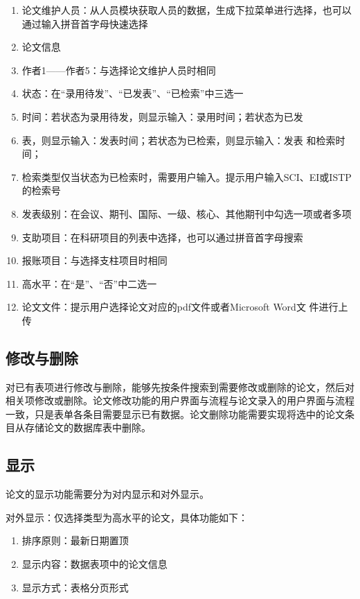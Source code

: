 \begin{enumerate}
\item 论文维护人员：从人员模块获取人员的数据，生成下拉菜单进行选择，也可以通过输入拼音首字母快速选择
\item 论文信息
\item 作者1——作者5：与选择论文维护人员时相同
\item 状态：在“录用待发”、“已发表”、“已检索”中三选一
\item 时间：若状态为录用待发，则显示输入：录用时间；若状态为已发
\item 表，则显示输入：发表时间；若状态为已检索，则显示输入：发表
和检索时间；
\item 检索类型仅当状态为已检索时，需要用户输入。提示用户输入SCI、EI或ISTP的检索号
\item 发表级别：在会议、期刊、国际、一级、核心、其他期刊中勾选一项或者多项
\item 支助项目：在科研项目的列表中选择，也可以通过拼音首字母搜索
\item 报账项目：与选择支柱项目时相同
\item 高水平：在“是”、“否”中二选一
\item 论文文件：提示用户选择论文对应的pdf文件或者Microsoft Word文
件进行上传
\end{enumerate}

\subsection{修改与删除}

对已有表项进行修改与删除，能够先按条件搜索到需要修改或删除的论文，然后对相关项修改或删除。论文修改功能的用户界面与流程与论文录入的用户界面与流程一致，只是表单各条目需要显示已有数据。论文删除功能需要实现将选中的论文条目从存储论文的数据库表中删除。


\subsection{显示}

论文的显示功能需要分为对内显示和对外显示。

对外显示：仅选择类型为高水平的论文，具体功能如下：

\begin{enumerate}
\item 排序原则：最新日期置顶
\item 显示内容：数据表项中的论文信息 
\item 显示方式：表格分页形式
\end{enumerate}

